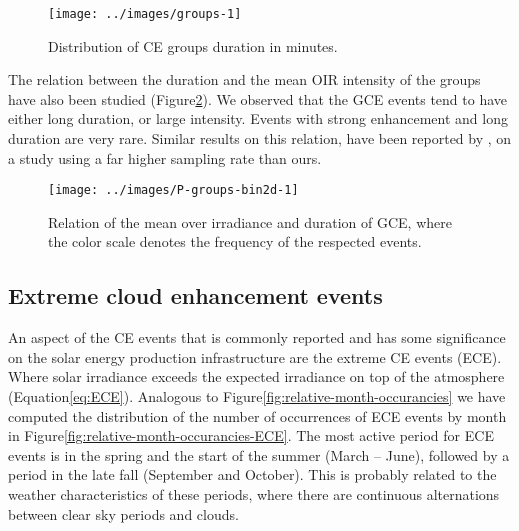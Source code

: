 \documentclass[preprint, 5p,
authoryear]{elsarticle} %
\begin{document}
\begin{figure}

{\centering \texttt{[image: ../images/groups-1]} 

}

\caption{Distribution of CE groups duration in minutes.}\label{fig:ceg-duration-distribution}
\end{figure}

The relation between the duration and the mean OIR intensity of the
groups have also been studied (Figure\nobreakspace{}\ref{fig:group-2d}).
We observed that the GCE events tend to have either long duration, or
large intensity. Events with strong enhancement and long duration are
very rare. Similar results on this relation, have been reported by
\citet{Zhang2018}, on a study using a far higher sampling rate than
ours.

\begin{figure}

{\centering \texttt{[image: ../images/P-groups-bin2d-1]} 

}

\caption{Relation of the mean over irradiance and duration of GCE, where the color scale denotes the frequency of the respected events.}\label{fig:group-2d}
\end{figure}

\hypertarget{extreme-cloud-enhancement-events}{%
\subsection{Extreme cloud enhancement
events}\label{extreme-cloud-enhancement-events}}

An aspect of the CE events that is commonly reported and has some
significance on the solar energy production infrastructure are the
extreme CE events (ECE). Where solar irradiance exceeds the expected
irradiance on top of the atmosphere
(Equation\nobreakspace{}\ref{eq:ECE}). Analogous to
Figure\nobreakspace{}\ref{fig:relative-month-occurancies} we have
computed the distribution of the number of occurrences of ECE events by
month in Figure\nobreakspace{}\ref{fig:relative-month-occurancies-ECE}.
The most active period for ECE events is in the spring and the start of
the summer (March -- June), followed by a period in the late fall
(September and October). This is probably related to the weather
characteristics of these periods, where there are continuous
alternations between clear sky periods and clouds.
\end{document}
